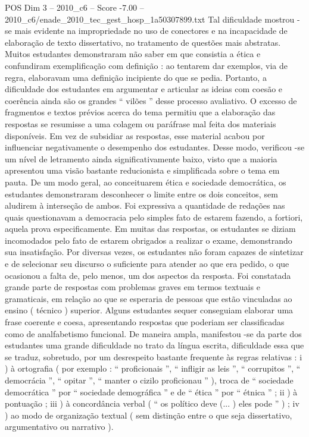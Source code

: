 \begin{textsample}{POS Dim 3 – 2010\_c6 – Score -7.00 – 2010\_c6/enade\_2010\_tec\_gest\_hosp\_1a50307899.txt}
Tal dificuldade mostrou -se mais evidente na impropriedade no uso de conectores e na incapacidade de elaboração de texto dissertativo, no tratamento de questões mais abstratas.
Muitos estudantes demonstraram não saber em que consistia a ética e confundiram exemplificação com definição : ao tentarem dar exemplos, via de regra, elaboravam uma definição incipiente do que se pedia.
Portanto, a dificuldade dos estudantes em argumentar e articular as ideias com coesão e coerência ainda são os grandes “ vilões ” desse processo avaliativo.
O excesso de fragmentos e textos prévios acerca do tema permitiu que a elaboração das respostas se resumisse a uma colagem ou paráfrase mal feita dos materiais disponíveis.
Em vez de subsidiar as respostas, esse material acabou por influenciar negativamente o desempenho dos estudantes.
Desse modo, verificou -se um nível de letramento ainda significativamente baixo, visto que a maioria apresentou uma visão bastante reducionista e simplificada sobre o tema em pauta.
De um modo geral, ao conceituarem ética e sociedade democrática, os estudantes demonstraram desconhecer o limite entre os dois conceitos, sem aludirem à interseção de ambos.
Foi expressiva a quantidade de redações nas quais questionavam a democracia pelo simples fato de estarem fazendo, a fortiori, aquela prova especificamente.
Em muitas das respostas, os estudantes se diziam incomodados pelo fato de estarem obrigados a realizar o exame, demonstrando sua insatisfação.
Por diversas vezes, os estudantes não foram capazes de sintetizar e de selecionar seu discurso o suficiente para atender ao que era pedido, o que ocasionou a falta de, pelo menos, um dos aspectos da resposta.
Foi constatada grande parte de respostas com problemas graves em termos textuais e gramaticais, em relação ao que se esperaria de pessoas que estão vinculadas ao ensino ( técnico ) superior.
Alguns estudantes sequer conseguiam elaborar uma frase coerente e coesa, apresentando respostas que poderiam ser classificadas como de analfabetismo funcional.
De maneira ampla, manifestou -se da parte dos estudantes uma grande dificuldade no trato da língua escrita, dificuldade essa que se traduz, sobretudo, por um desrespeito bastante frequente às regras relativas : i ) à ortografia ( por exemplo : “ proficionais ”, “ infligir as leis ”, “ corrupitos ”, “ democrácia ”, “ opitar ”, “ manter o cizilo proficionau ” ), troca de “ sociedade democrática ” por “ sociedade demográfica ” e de “ ética ” por “ étnica ” ; ii ) à pontuação ; iii ) à concordância verbal ( “ os político deve (... ) eles pode ” ) ; iv ) ao modo de organização textual ( sem distinção entre o que seja dissertativo, argumentativo ou narrativo ).

\end{textsample}
